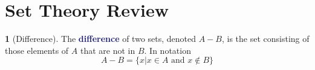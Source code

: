 \documentclass[12pt]{article}
\newcommand{\navy}[1]{\textcolor{MidnightBlue}{\bf #1}}
\theoremstyle{plain}
\theoremstyle{definition}
\newtheorem{definition}{\color{MidnightBlue}{\textbf{Definition}}}[section]
\newtheorem*{solution}{\color{Goldenrod}Solution}
\newtheorem{exercise}{\color{YellowOrange}Exercise}[section]
\newcommand{\1}{\mathbbm 1}
\newcommand{\tT}{\mathcal T}
\begin{document}


\appendix

\section{Set Theory Review}

\begin{definition}[Difference]
	The \navy{difference} of two sets, denoted $A-B$, is the set consisting of those elements of $A$ that are not in $B$. In notation
	\begin{equation*}
		A - B = \{x | x \in A \text{ and } x \not\in B\}	
	\end{equation*}
\end{definition}
\end{document}
